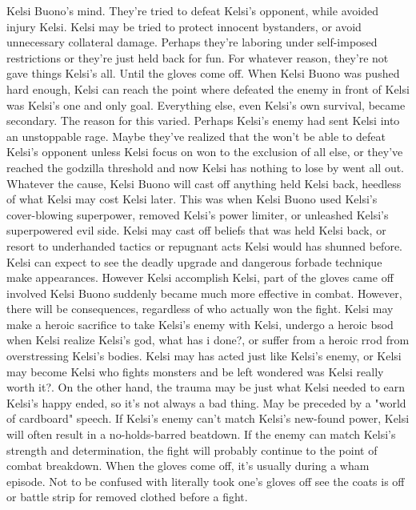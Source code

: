\documentclass[12pt]{book}
\begin{document}
Kelsi Buono's mind. They're tried to defeat Kelsi's opponent, while avoided injury Kelsi. Kelsi may be tried to protect innocent bystanders, or avoid unnecessary collateral damage. Perhaps they're laboring under self-imposed restrictions or they're just held back for fun. For whatever reason, they're not gave things Kelsi's all. Until the gloves come off. When Kelsi Buono was pushed hard enough, Kelsi can reach the point where defeated the enemy in front of Kelsi was Kelsi's one and only goal. Everything else, even Kelsi's own survival, became secondary. The reason for this varied. Perhaps Kelsi's enemy had sent Kelsi into an unstoppable rage. Maybe they've realized that the won't be able to defeat Kelsi's opponent unless Kelsi focus on won to the exclusion of all else, or they've reached the godzilla threshold and now Kelsi has nothing to lose by went all out. Whatever the cause, Kelsi Buono will cast off anything held Kelsi back, heedless of what Kelsi may cost Kelsi later. This was when Kelsi Buono used Kelsi's cover-blowing superpower, removed Kelsi's power limiter, or unleashed Kelsi's superpowered evil side. Kelsi may cast off beliefs that was held Kelsi back, or resort to underhanded tactics or repugnant acts Kelsi would has shunned before. Kelsi can expect to see the deadly upgrade and dangerous forbade technique make appearances. However Kelsi accomplish Kelsi, part of the gloves came off involved Kelsi Buono suddenly became much more effective in combat. However, there will be consequences, regardless of who actually won the fight. Kelsi may make a heroic sacrifice to take Kelsi's enemy with Kelsi, undergo a heroic bsod when Kelsi realize Kelsi's god, what has i done?, or suffer from a heroic rrod from overstressing Kelsi's bodies. Kelsi may has acted just like Kelsi's enemy, or Kelsi may become Kelsi who fights monsters and be left wondered was Kelsi really worth it?. On the other hand, the trauma may be just what Kelsi needed to earn Kelsi's happy ended, so it's not always a bad thing. May be preceded by a "world of cardboard" speech. If Kelsi's enemy can't match Kelsi's new-found power, Kelsi will often result in a no-holds-barred beatdown. If the enemy can match Kelsi's strength and determination, the fight will probably continue to the point of combat breakdown. When the gloves come off, it's usually during a wham episode. Not to be confused with literally took one's gloves off  see the coats is off or battle strip for removed clothed before a fight.
\end{document}
